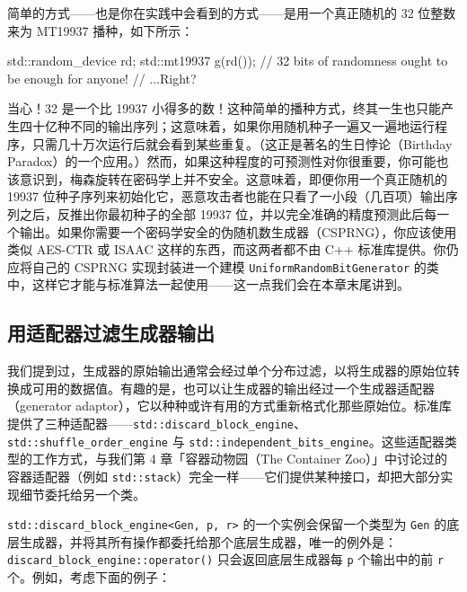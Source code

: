 简单的方式——也是你在实践中会看到的方式——是用一个真正随机的 32 位整数来为 MT19937 播种，如下所示：

\begin{codebox}[cpp]
     std::random_device rd;
     std::mt19937 g(rd());
       // 32 bits of randomness ought to be enough for anyone!
       // ...Right?
\end{codebox}

当心！32 是一个比 19937 小得多的数！这种简单的播种方式，终其一生也只能产生四十亿种不同的输出序列；这意味着，如果你用随机种子一遍又一遍地运行程序，只需几十万次运行后就会看到某些重复。（这正是著名的生日悖论（Birthday Paradox）的一个应用。）然而，如果这种程度的可预测性对你很重要，你可能也该意识到，梅森旋转在密码学上并不安全。这意味着，即便你用一个真正随机的 19937 位种子序列来初始化它，恶意攻击者也能在只看了一小段（几百项）输出序列之后，反推出你最初种子的全部 19937 位，并以完全准确的精度预测此后每一个输出。如果你需要一个密码学安全的伪随机数生成器（CSPRNG），你应该使用类似 AES-CTR 或 ISAAC 这样的东西，而这两者都不由 C++ 标准库提供。你仍应将自己的 CSPRNG 实现封装进一个建模 \texttt{Uniform\allowbreak{}Random\allowbreak{}Bit\allowbreak{}Generator} 的类中，这样它才能与标准算法一起使用——这一点我们会在本章末尾讲到。

\subsection{用适配器过滤生成器输出}

我们提到过，生成器的原始输出通常会经过单个分布过滤，以将生成器的原始位转换成可用的数据值。有趣的是，也可以让生成器的输出经过一个生成器适配器（generator adaptor），它以种种或许有用的方式重新格式化那些原始位。标准库提供了三种适配器——\texttt{std::\allowbreak{}discard\_\allowbreak{}block\_\allowbreak{}engine}、\texttt{std::\allowbreak{}shuffle\_\allowbreak{}order\_\allowbreak{}engine} 与 \texttt{std::\allowbreak{}independent\_\allowbreak{}bits\_\allowbreak{}engine}。这些适配器类型的工作方式，与我们第 4 章「容器动物园（The Container Zoo）」中讨论过的容器适配器（例如 \texttt{std::\allowbreak{}stack}）完全一样——它们提供某种接口，却把大部分实现细节委托给另一个类。

\texttt{std::\allowbreak{}discard\_\allowbreak{}block\_\allowbreak{}engine<\allowbreak{}Gen,\allowbreak{} p,\allowbreak{} r>\allowbreak{}} 的一个实例会保留一个类型为 \texttt{Gen} 的底层生成器，并将其所有操作都委托给那个底层生成器，唯一的例外是：\texttt{discard\_\allowbreak{}block\_\allowbreak{}engine::\allowbreak{}operator(\allowbreak{})\allowbreak{}} 只会返回底层生成器每 \texttt{p} 个输出中的前 \texttt{r} 个。例如，考虑下面的例子：

